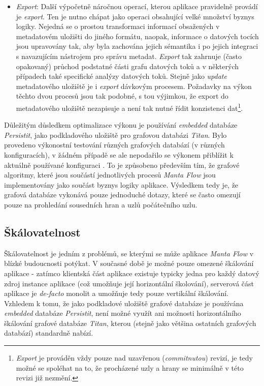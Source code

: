 \begin{itemize}
	\item{\textit{Export}}: Další výpočetně náročnou operací, kterou aplikace pravidelně provádí je \textit{export}. Ten je nutno chápat jako operaci obsahující velké množství byznys logiky. Nejedná se o prostou transformaci informací obsažených v metadatovém uložišti do jiného formátu, naopak, informace o datových tocích jsou upravovány tak, aby byla zachována jejich sémantika i po jejich integraci s navazujícím nástrojem pro správu metadat. \textit{Export} tak zahrnuje (často opakovaný) průchod podstatné části grafu datových toků a v některých případech také specifické analýzy datových toků. Stejně jako \textit{update} metadatového uložiště je i \textit{export} dávkovým procesem. Požadavky na výkon těchto dvou procesů jsou tak podobné, s tou výjimkou, že export do metadatového uložiště nezapisuje a není tak nutné řídit konzistenci dat\footnote{\textit{Export} je prováděn vždy pouze nad uzavřenou (\textit{commitnutou}) revizí, je tedy možné se spoléhat na to, že procházené uzly a hrany se minimálně v této revizi již nezmění.}.

\end{itemize}

Důležitým důsledkem optimalizace výkonu je používání \textit{embedded} databáze \textit{Persistit}, jako podkladového uložiště pro grafovou databázi \textit{Titan}. Bylo provedeno výkonostní testování různých grafových databází (v různých konfiguracích), v žádném případě se ale nepodařilo se výkonem přiblížit k aktuálně používané konfiguraci \cite{Kovar18}. To je způsobeno především tím, že grafové algoritmy, které jsou součástí jednotlivých procesů \textit{Manta Flow} jsou implementovány jako součást byznys logiky aplikace. Výsledkem tedy je, že grafová databáze vykonává pouze jednoduché dotazy, které se často omezují pouze na prohledání sousedních hran a uzlů počátečního uzlu.

\subsection{Škálovatelnost}
\label{sec:ana_scaling}
Škálovatelnost je jedním z problémů, se kterými se může aplikace \textit{Manta Flow} v blízké budoucnosti potýkat. V současné době je možné pouze omezené škálování aplikace - zatímco klientská část aplikace existuje typicky jedna pro každý datový zdroj instance aplikace (což umožňuje její horizontální školování), serverová část aplikace je \textit{de-facto} monolit a umožňuje tedy pouze vertikální škálování. Vzhledem k tomu, že jako podkladové uložiště grafové databáze je používána \textit{embedded} databáze \textit{Persistit}, není možné využít ani možnosti horizontálního škálování grafové databáze \textit{Titan}, kterou (stejně jako většina ostatních grafových databází) standardně nabízí.

